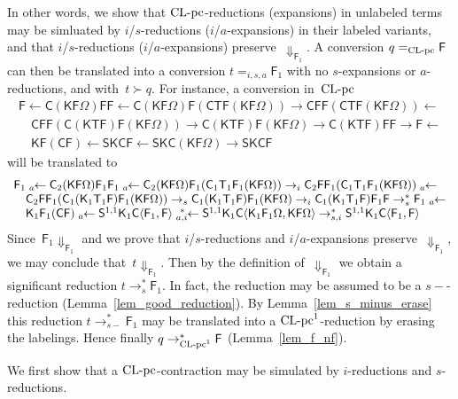 \documentclass[a4paper,UKenglish]{lipics-v2016}
\newcommand{\Cs}{\mathsf{C}}
\newcommand{\Fs}{\mathsf{F}}
\newcommand{\Ts}{\mathsf{T}}
\newcommand{\Ss}{\mathsf{S}}
\newcommand{\Ks}{\mathsf{K}}
\newcommand{\from}{\ensuremath{\leftarrow}}
\newcommand{\Da}{\ensuremath{\Downarrow}}
\newcommand{\reduces}{\ensuremath{\to^*}}
\newcommand{\la}{\ensuremath{\langle}}
\newcommand{\ra}{\ensuremath{\rangle}}
\newcommand{\leftidx}[3]{{\;\vphantom{#2}}#1\!\!#2#3}
\newcommand{\CLC}{{\mbox{${\text{\rm CL-pc}^1}$}}}
\newcommand{\CLCz}{{\mbox{$\text{\rm CL-pc}$}}}
\newcommand{\sCLC}{{\ensuremath{\text{\rm CL-pc}^1}}}
\newcommand{\sCLCz}{\ensuremath{\text{\rm CL-pc}}}
\newcommand{\equiverased}{\succ}
\begin{document}
In other words, we show that $\CLCz$-reductions (expansions) in
unlabeled terms may be simluated by $i$/$s$-reductions
($i$/$a$-expansions) in their labeled variants, and that
$i$/$s$-reductions ($i$/$a$-expansions) preserve~$\Da_{\Fs_1}$. A
conversion $q =_{\sCLCz} \Fs$ can then be translated into a conversion
$t =_{i,s,a} \Fs_1$ with no $s$-expansions or $a$-reductions, and
with~$t \equiverased q$. For instance, a conversion in~$\CLCz$
\[
\begin{array}{l}
  \Fs \from \Cs (\Ks \Fs \Omega) \Fs \Fs \from \Cs (\Ks \Fs \Omega)
  \Fs (\Cs \Ts \Fs (\Ks \Fs \Omega)) \to \Cs \Fs \Fs (\Cs \Ts \Fs (\Ks
  \Fs \Omega)) \from \\ \quad \Cs \Fs \Fs (\Cs (\Ks \Ts \Fs) \Fs (\Ks \Fs
  \Omega)) \to \Cs (\Ks \Ts \Fs) \Fs (\Ks \Fs \Omega) \to \Cs (\Ks \Ts
  \Fs) \Fs \Fs \to \Fs \from \\ \quad \Ks \Fs (\Cs \Fs) \from \Ss \Ks \Cs \Fs
  \from \Ss \Ks \Cs (\Ks \Fs \Omega) \to \Ss \Ks \Cs \Fs
\end{array}
\]
will be translated to
\[
\begin{array}{l}
  \Fs_1 \leftidx{{}_a}{\from} \Cs_2 (\Ks \Fs \Omega) \Fs_1 \Fs_1 \leftidx{{}_a}{\from} \Cs_2 (\Ks \Fs \Omega)
  \Fs_1 (\Cs_1 \Ts_1 \Fs_1 (\Ks \Fs \Omega)) \to_i \Cs_2 \Fs \Fs_1 (\Cs_1 \Ts_1 \Fs_1 (\Ks
  \Fs \Omega)) \leftidx{{}_a}{\from} \\ \quad \Cs_2 \Fs \Fs_1 (\Cs_1 (\Ks_1 \Ts_1 \Fs) \Fs_1 (\Ks \Fs
  \Omega)) \to_s \Cs_1 (\Ks_1 \Ts_1 \Fs) \Fs_1 (\Ks \Fs \Omega) \to_i \Cs_1 (\Ks_1 \Ts_1
  \Fs) \Fs_1 \Fs \reduces_s \Fs_1 \leftidx{{}_a}{\from} \\ \quad \Ks_1
  \Fs_1 (\Cs \Fs) \leftidx{{}_a}{\from} \Ss^{1,1} \Ks_1 \Cs \la \Fs_1,
  \Fs \ra
  \leftidx{{}_{a,i}^{~*}}{\from} \Ss^{1,1} \Ks_1 \Cs \la \Ks_1 \Fs_1 \Omega,
  \Ks \Fs \Omega \ra \reduces_{s,i} \Ss^{1,1} \Ks_1 \Cs \la \Fs_1, \Fs \ra
\end{array}
\]
Since~$\Fs_1 \Da_{\Fs_1}$ and we prove that $i$/$s$-reductions and
$i$/$a$-expansions preserve~$\Da_{\Fs_1}$, we may conclude
that~$t \Da_{\Fs_1}$. Then by the definition of~$\Da_{\Fs_1}$ we
obtain a significant reduction $t \to_s^* \Fs_1$. In fact, the
reduction may be assumed to be a $s{-}$-reduction
(Lemma~\ref{lem_good_reduction}). By Lemma~\ref{lem_s_minus_erase}
this reduction $t \to_{s{-}}^{*} \Fs_1$ may be translated into a
$\CLC$-reduction by erasing the labelings. Hence finally
$q \reduces_\sCLC \Fs$ (Lemma~\ref{lem_f_nf}).

We first show that a $\CLCz$-contraction may be simulated by
$i$-reductions and $s$-reductions.
\end{document}
